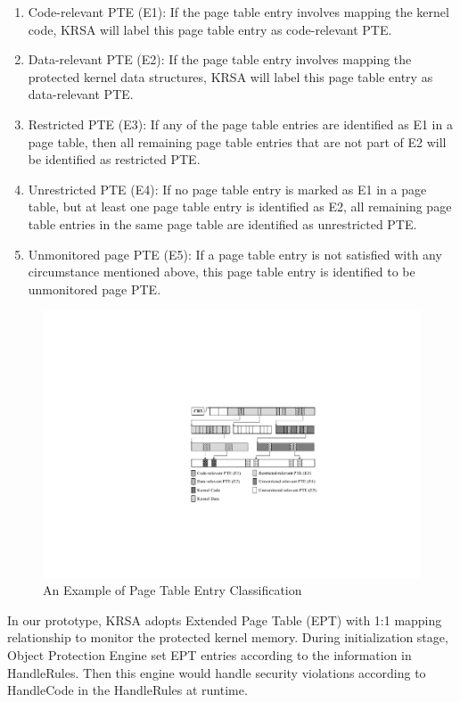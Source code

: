 \documentclass[conference]{IEEEtran}
\begin{document}
\begin{enumerate}
\item Code-relevant PTE (E1): If the page table entry involves mapping the kernel code, KRSA will label this page table entry as code-relevant PTE.
\item Data-relevant PTE (E2): If the page table entry involves mapping the protected kernel data structures, KRSA will label this page table entry as data-relevant PTE.
\item Restricted PTE (E3): If any of the page table entries are identified as E1 in a page table, then all remaining page table entries that are not part of E2 will be identified as restricted PTE.
\item Unrestricted PTE (E4): If no page table entry is marked as E1 in a page table, but at least one page table entry is identified as E2, all remaining page table entries in the same page table are identified as unrestricted PTE.
\item Unmonitored page PTE (E5): If a page table entry is not satisfied with any circumstance mentioned above, this page table entry is identified to be unmonitored page PTE.
\end{enumerate}

\begin{figure}
    \centering
    \includegraphics[scale=0.5]{pic/page_table.pdf}
    \caption{An Example of Page Table Entry Classification}
    \label{pg}
\end{figure}



In our prototype, KRSA adopts Extended Page Table (EPT) with 1:1 mapping relationship to monitor the protected kernel memory. During initialization stage, Object Protection Engine set EPT entries according to the information in HandleRules. Then this engine would handle security violations according to HandleCode in the HandleRules at runtime. 
\end{document}
